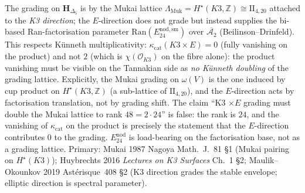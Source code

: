 \begin{remark}
\label{rem:cydkappa-mukai-grading-direction}
The grading on $\mathbf H_{\Delta_5}$ is by the Mukai lattice
$\Lambda_{\mathrm{Muk}} = H^\star(K3,\mathbb Z) \cong \mathrm{II}_{4,20}$
attached to the \emph{K3 direction}; the $E$-direction does not
grade but instead supplies the bi-based Ran-factorisation parameter
$\mathrm{Ran}(E^{\mathrm{nod},\mathrm{sm}}_{24})$ over
$\overline{\mathcal A_2}$ (Beilinson--Drinfeld). This respects
K\"unneth multiplicativity:
$\kappa_{\mathrm{cat}}(K3\times E) = 0$ (fully vanishing on the
product) and not $2$ (which is $\chi(\mathcal O_{K3})$ on the fibre
alone): the product vanishing must be visible on the Tannakian side
as \emph{no K\"unneth doubling} of the grading lattice. Explicitly,
the Mukai grading on $\omega(V)$ is the one induced by cup product on
$H^\star(K3,\mathbb Z)$ (a sub-lattice of
$\mathrm{II}_{4,20}$), and the $E$-direction acts by factorisation
translation, not by grading shift. The claim
``K3 $\times E$ grading must double the Mukai lattice to rank
$48 = 2 \cdot 24$'' is false: the rank is $24$, and the vanishing
of $\kappa_{\mathrm{cat}}$ on the product is precisely the statement
that the $E$-direction contributes $0$ to the grading.
$E^{\mathrm{nod}}_{24}$ is load-bearing on the
factorisation base, not as a grading lattice. Primary: Mukai 1987
Nagoya Math.~J.~81 \S1 (Mukai pairing on $H^\star(K3)$);
Huybrechts 2016 \emph{Lectures on K3 Surfaces} Ch.~1 \S2;
Maulik--Okounkov 2019 Ast\'erisque~408 \S2 (K3 direction grades the
stable envelope; elliptic direction is spectral parameter).
\end{remark}

